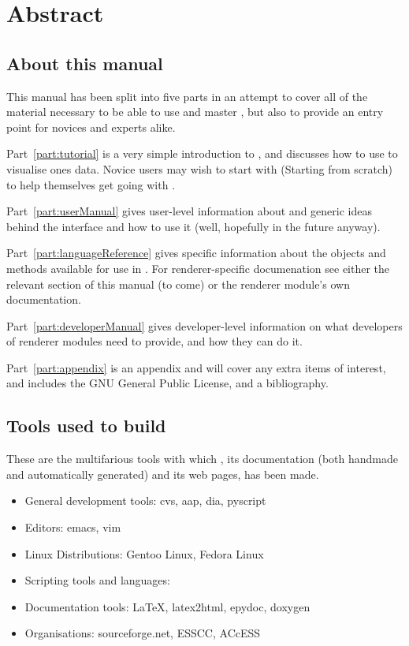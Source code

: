 
\chapter*{Abstract}

\section*{About this manual}

This manual has been split into five parts in an attempt to cover all of the
material necessary to be able to use and master \pyvisi, but also to provide an
entry point for novices and experts alike.

Part~\ref{part:tutorial} is a very simple introduction to \pyvisi, and
discusses how to use \pyvisi to visualise ones data.  Novice users may wish to
start with  (Starting from scratch) to help
themselves get going with \pyvisi.  

Part~\ref{part:userManual} gives user-level information about \pyvisi and
generic ideas behind the interface and how to use it (well, hopefully in the
future anyway).

Part~\ref{part:languageReference} gives specific information about the objects
and methods available for use in \pyvisi.  For renderer-specific documenation
see either the relevant section of this manual (to come) or the renderer
module's own documentation.

Part~\ref{part:developerManual} gives developer-level information on what
developers of renderer modules need to provide, and how they can do it.

Part~\ref{part:appendix} is an appendix and will cover any extra items of
interest, and includes the GNU General Public License, and a bibliography.

\section*{Tools used to build \pyvisi}

These are the multifarious tools with which \pyvisi, its documentation (both
handmade and automatically generated) and its web pages, has been made.

\begin{itemize}
\item General development tools: cvs, aap, dia, pyscript
\item Editors: emacs, vim
\item Linux Distributions: Gentoo Linux, Fedora Linux
\item Scripting tools and languages: ~\cite{web:python}
\item Documentation tools: \LaTeX, latex2html, epydoc, doxygen
\item Organisations: sourceforge.net, ESSCC, ACcESS
\end{itemize}

